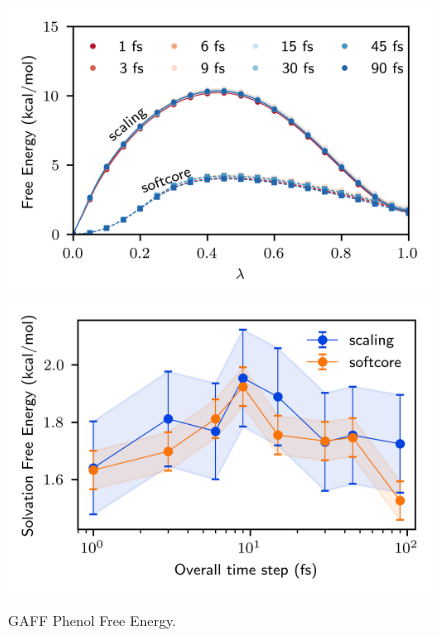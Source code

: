 \documentclass[
aip,
jcp,
reprint,
]{revtex4-1}
\begin{document}
\begin{figure}
	\centering
	\includegraphics{gaff_phenol_vdw_free_energy_profiles}
	\includegraphics{gaff_phenol_vdw_free_energies}
	\caption{GAFF Phenol Free Energy.}
	\label{fig:phenol vdw free energy}
\end{figure}
\end{document}
